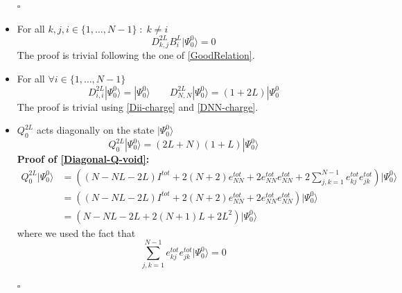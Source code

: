 \documentclass[10pt]{article}
\numberwithin{equation}{section}
\numberwithin{equation}{subsection}
\begin{document}
\begin{itemize}
\begin{flushright}
	$\square$
\end{flushright}
\item For all $k,j,i\in\{1,\ldots,N-1\}\;:\;k\neq i$
\begin{equation}\label{DijBk-different}
	D_{k,j}^{2L}B_{i}^{L}|\Psi_{0}^{0}\rangle=0
\end{equation}
The proof is trivial following the one of \eqref{GoodRelation}. 
\item For all $ \forall i\in \{1,\ldots,N-1\}$
\begin{equation}\label{Dii-ref}
	D_{i,i}^{2L}|\Psi_{0}^{0}\rangle=|\Psi_{0}^{0}\rangle\qquad D_{N,N}^{2L}|\Psi_{0}^{0}\rangle=(1+2L)|\Psi_{0}^{0}
\end{equation}
The proof is trivial using \eqref{Dii-charge} and \eqref{DNN-charge}. 
\item $Q_{0}^{2L}$ acts diagonally on the state $|\Psi_{0}^{0}\rangle$
\begin{equation}\label{Diagonal-Q-void}
	Q_{0}^{2L}|\Psi_{0}^{0}\rangle=(2L+N)(1+L)|\Psi_{0}^{0}\rangle
\end{equation}
\textbf{Proof of \eqref{Diagonal-Q-void}:}
\begin{align}
	Q_{0}^{2L}|\Psi_{0}^{0}\rangle&=\left((N-NL-2L)I^{tot}+2(N+2)e_{NN}^{tot}+2e_{NN}^{tot}e_{NN}^{tot}+2\sum_{j,k=1}^{N-1}e_{kj}^{tot}e_{jk}^{tot}\right)|\Psi_{0}^{0}\rangle\nonumber\\&=
	\left((N-NL-2L)I^{tot}+2(N+2)e_{NN}^{tot}+2e_{NN}^{tot}e_{NN}^{tot}\right)|\Psi_{0}^{0}\rangle\nonumber
	\\&=
	(N-NL-2L+2(N+1)L+2L^{2})|\Psi_{0}^{0}\rangle
\end{align}
where we used the fact that 
\begin{equation}
	\sum_{j,k=1}^{N-1}e_{kj}^{tot}e_{jk}^{tot}|\Psi_{0}^{0}\rangle=0
\end{equation}
\begin{flushright}
	$\square$
\end{flushright}
\end{itemize}
\end{document}
